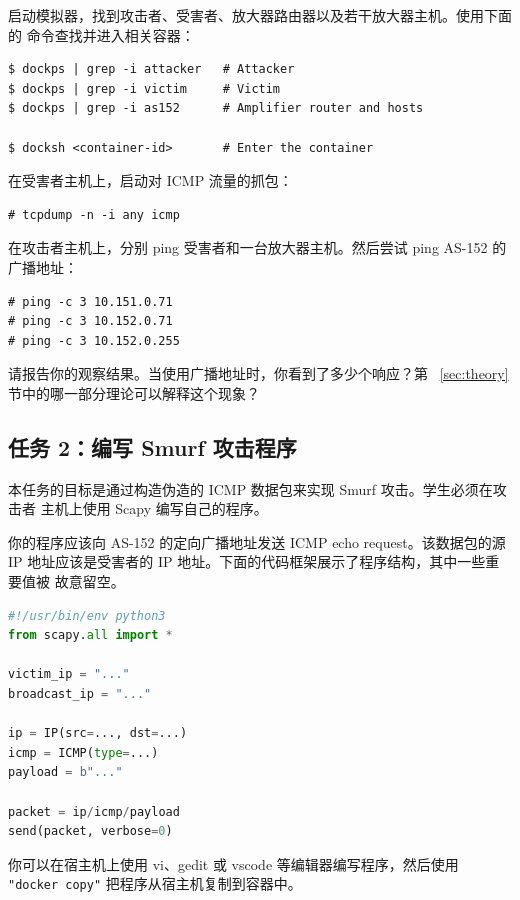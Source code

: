 启动模拟器，找到攻击者、受害者、放大器路由器以及若干放大器主机。使用下面的
命令查找并进入相关容器：

\begin{lstlisting}
$ dockps | grep -i attacker   # Attacker
$ dockps | grep -i victim     # Victim
$ dockps | grep -i as152      # Amplifier router and hosts

$ docksh <container-id>       # Enter the container
\end{lstlisting}

在受害者主机上，启动对 ICMP 流量的抓包：

\begin{lstlisting}
# tcpdump -n -i any icmp
\end{lstlisting}

在攻击者主机上，分别 ping 受害者和一台放大器主机。然后尝试 ping AS-152 的
广播地址：

\begin{lstlisting}
# ping -c 3 10.151.0.71
# ping -c 3 10.152.0.71
# ping -c 3 10.152.0.255
\end{lstlisting}

请报告你的观察结果。当使用广播地址时，你看到了多少个响应？第
~\ref{sec:theory} 节中的哪一部分理论可以解释这个现象？


\subsection{任务 2：编写 Smurf 攻击程序}

本任务的目标是通过构造伪造的 ICMP 数据包来实现 Smurf 攻击。学生必须在攻击者
主机上使用 Scapy 编写自己的程序。

你的程序应该向 AS-152 的定向广播地址发送 ICMP echo request。该数据包的源 IP
地址应该是受害者的 IP 地址。下面的代码框架展示了程序结构，其中一些重要值被
故意留空。

\begin{lstlisting}[language=python]
#!/usr/bin/env python3
from scapy.all import *

victim_ip = "..."
broadcast_ip = "..."

ip = IP(src=..., dst=...)
icmp = ICMP(type=...)
payload = b"..."

packet = ip/icmp/payload
send(packet, verbose=0)
\end{lstlisting}

你可以在宿主机上使用 vi、gedit 或 vscode 等编辑器编写程序，然后使用
\texttt{"docker copy"} 把程序从宿主机复制到容器中。


